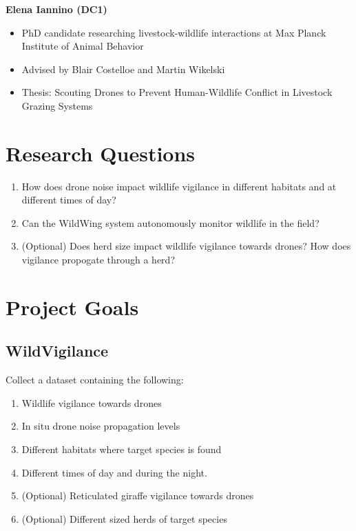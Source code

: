 \documentclass[final,5p,times,twocolumn]{elsarticle}
\begin{document}
\textbf{Elena Iannino (DC1)}
\begin{itemize}
    \item PhD candidate researching livestock-wildlife interactions at Max Planck Institute of Animal Behavior
    \item Advised by Blair Costelloe and Martin Wikelski
    \item Thesis: Scouting Drones to Prevent Human-Wildlife Conflict in Livestock Grazing Systems
\end{itemize}



\section{Research Questions}
\begin{enumerate}
    \item How does drone noise impact wildlife vigilance in different habitats and at different times of day?
    \item Can the WildWing system autonomously monitor wildlife in the field?
    \item (Optional) Does herd size impact wildlife vigilance towards drones? How does vigilance propogate through a herd? 
\end{enumerate}


\section{Project Goals}
\subsection{WildVigilance}
Collect a dataset containing the following:
\begin{enumerate}
    \item Wildlife vigilance towards drones
    \item In situ drone noise propagation levels
    \item Different habitats where target species is found
    \item Different times of day and during the night.
    \item (Optional) Reticulated giraffe vigilance towards drones
    \item (Optional) Different sized herds of target species
\end{enumerate}
\end{document}
